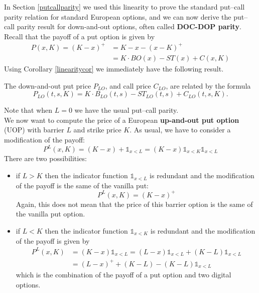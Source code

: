 In Section \ref{putcallparity} we used this linearity to prove the standard put–call parity relation for standard European options, and we can now derive the put–call parity result for down-and-out options, often called \textbf{DOC-DOP parity}. Recall that the payoff of a put option is given by
\begin{align*}
    P(x,K) = (K-x)^+ &= K - x - (x - K)^+ \\
    &=
    K\cdot BO(x) - ST(x) + C(x,K)
\end{align*}
Using Corollary \ref{linearitycor} we immediately have the following result.
\begin{proposition}
    The down-and-out put price $P_{LO}$, and call price $C_{LO}$, are related by the formula
    \begin{equation}
        P_{LO}(t, s, K) = K\cdot B_{LO}(t, s) - ST_{LO}(t,s) + C_{LO}(t, s, K).
    \end{equation}
\end{proposition}
Note that when $L = 0$ we have the usual put–call parity.\\
We now want to compute the price of a European \textbf{up-and-out put option} (UOP) with barrier $L$ and strike price $K$. As usual, we have to consider a modification of the payoff:
\begin{equation}
    P^L(x,K)=(K-x)+\mathds{1}_{x<L} = (K-x)\mathds{1}_{x<K}\mathds{1}_{x<L}
\end{equation}
There are two possibilities:
\begin{itemize}
    \item if $L > K$ then the indicator function $\mathds{1}_{x<L}$ is redundant and the modification of the payoff is the same of the vanilla put:
    \begin{equation*}
        P^L(x, K) = (K - x)^+
    \end{equation*}
    Again, this does not mean that the price of this barrier option is the same of the vanilla put option.
    \item if $L < K$ then the indicator function $\mathds{1}_{x<K}$ is redundant and the modification of the payoff is given by
    \begin{align*}
        P^L(x, K) &= (K-x)\mathds{1}_{x<L} =(L-x)\mathds{1}_{x<L}+(K-L)\mathds{1}_{x<L} \\
        &=
        (L-x)^+ +(K-L)-(K-L)\mathds{1}_{x<L}
    \end{align*}
    which is the combination of the payoff of a put option and two digital options.
\end{itemize}
